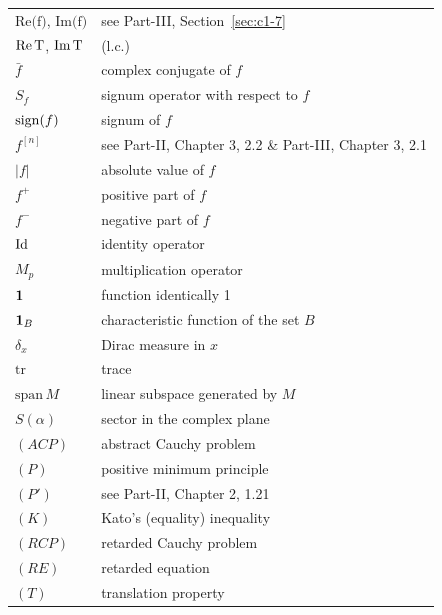 \begin{longtable}{p{}p{}}
$\text{Re(f)}$, $\text{Im(f)}$ &  see Part-III, Section~\ref{sec:c1-7} \\ %
$\text{Re\,T}$, $\text{Im\,T}$ & (l.c.) \\ %
$\bar{f}$ & complex conjugate of $f$ \\ %
$S_{f}$ & signum operator with respect to $f$ \\ %
$\operatorname{sign}(f)$ & signum of $f$  \\ %
$f^{[n]}$ & see Part-II, Chapter 3, 2.2 \& Part-III, Chapter 3, 2.1 \\ %
$|f|$ & absolute value of $f$ \\ %
$f^{+}$ & positive part of $f$ \\ %
$f^{-}$ & negative part of $f$ \\ %
$\operatorname{Id}$ & identity operator \\ %
$M_{p}$ & multiplication operator \\ %
$\mathbf{1}$ & function identically 1 \\ %
$\mathbf{1}_{B}$ & characteristic function of the set $B$ \\ %
$\delta_{x}$ & Dirac measure in $x$ \\ %
$\text{tr}$ & trace \\ %
$\text{span}\,M$ & linear subspace generated by $M$ \\ %
$S(\alpha)$ & sector in the complex plane \\ %
$(ACP)$ & abstract Cauchy problem \\ %
$(P)$ & positive minimum principle \\ %
$(P')$ & see Part-II, Chapter 2, 1.21 \\ %
$(K)$ & Kato's (equality) inequality \\ %
$(RCP)$ & retarded Cauchy problem \\ %
$(RE)$ & retarded equation \\ %
$(T)$ & translation property \\ %
\end{longtable}

